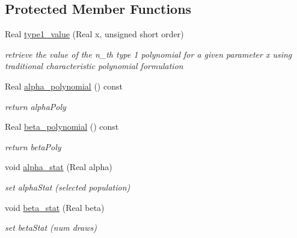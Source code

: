 \subsection*{Protected Member Functions}
\begin{DoxyCompactItemize}
\item 
Real \hyperlink{classPecos_1_1HahnOrthogPolynomial_a8792a858ac05a2158880e876f9da2019}{type1\+\_\+value} (Real x, unsigned short order)
\begin{DoxyCompactList}\small\item\em retrieve the value of the n\+\_\+th type 1 polynomial for a given parameter x using traditional characteristic polynomial formulation \end{DoxyCompactList}\item 
Real \hyperlink{classPecos_1_1HahnOrthogPolynomial_a997bdeddf670667c476513fcacc779ca}{alpha\+\_\+polynomial} () const \label{classPecos_1_1HahnOrthogPolynomial_a997bdeddf670667c476513fcacc779ca}

\begin{DoxyCompactList}\small\item\em return alpha\+Poly \end{DoxyCompactList}\item 
Real \hyperlink{classPecos_1_1HahnOrthogPolynomial_a22bfc4209dec76716ef51648e945469a}{beta\+\_\+polynomial} () const \label{classPecos_1_1HahnOrthogPolynomial_a22bfc4209dec76716ef51648e945469a}

\begin{DoxyCompactList}\small\item\em return beta\+Poly \end{DoxyCompactList}\item 
void \hyperlink{classPecos_1_1HahnOrthogPolynomial_aeeb4ce11a8d413209be1ec08eced8728}{alpha\+\_\+stat} (Real alpha)\label{classPecos_1_1HahnOrthogPolynomial_aeeb4ce11a8d413209be1ec08eced8728}

\begin{DoxyCompactList}\small\item\em set alpha\+Stat (selected population) \end{DoxyCompactList}\item 
void \hyperlink{classPecos_1_1HahnOrthogPolynomial_a7f9584e538ee1574bd4d8d1afb622ed6}{beta\+\_\+stat} (Real beta)\label{classPecos_1_1HahnOrthogPolynomial_a7f9584e538ee1574bd4d8d1afb622ed6}

\begin{DoxyCompactList}\small\item\em set beta\+Stat (num draws) \end{DoxyCompactList}\end{DoxyCompactItemize}
